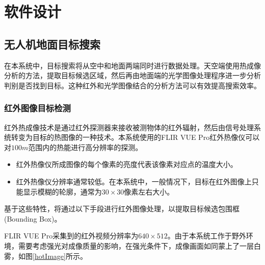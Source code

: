 \chapter{软件设计}
\thispagestyle{fancy}

\section{无人机地面目标搜索}

在本系统中，目标搜索将从空中和地面两端同时进行数据处理。天空端使用热成像分析的方法，提取目标候选区域，然后再由地面端的光学图像处理程序进一步分析判别是否找到目标。这种红外和光学图像结合的分析方法可以有效提高搜索效率。

\subsection{红外图像目标检测}

红外热成像技术是通过红外探测器来接收被测物体的红外辐射，然后由信号处理系统转变为目标的热图像的一种技术。本系统使用的FLIR VUE Pro红外热像仪可以对$100m$范围内的热能进行高分辨率的探测。


\begin{itemize}
    \item 红外热像仪所成图像的每个像素的亮度代表该像素对应点的温度大小。
    \item 红外热像仪分辨率通常较低。在本系统中，一般情况下，目标在红外图像上只能显示模糊的轮廓，通常为$30\times30$像素左右大小。
\end{itemize}

基于这些特性，将通过以下手段进行红外图像处理，以提取目标候选包围框(Bounding Box)。


FLIR VUE Pro采集到的红外视频分辨率为$640\times512$。由于本系统工作于野外环境，需要考虑强光对成像质量的影响，在强光条件下，成像画面如同蒙上了一层白雾，如图\ref{hotImage}所示。


